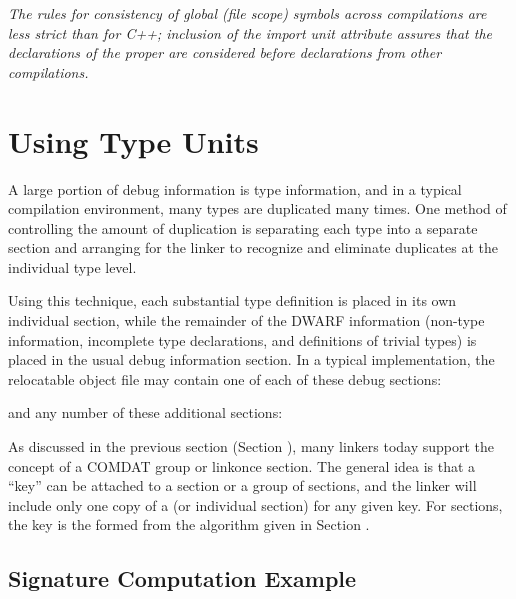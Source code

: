 \textit{The  rules for consistency of global (file scope) symbols
across compilations are less strict than for C++; inclusion
of the import unit attribute assures that the declarations of
the proper  are considered before declarations
from other compilations.}


\section{Using Type Units}
\label{app:usingtypeunits}

A large portion of debug information is type information, and
in a typical compilation environment, many types are duplicated
many times. One method of controlling the amount of duplication
is separating each type into a separate 
 section
and arranging for the linker to recognize and eliminate
duplicates at the individual type level.

Using this technique, each substantial type definition is
placed in its own individual section, while the remainder
of the DWARF information (non-type information, incomplete
type declarations, and definitions of trivial types) is
placed in the usual debug information section. In a typical
implementation, the relocatable object file may contain one
of each of these debug sections:

\begin{alltt}
\end{alltt}

and any number of these additional sections:

\begin{alltt}
\end{alltt}

As discussed in the previous section 
(Section ), 
many
linkers today support the concept of a COMDAT group or
linkonce section. The general idea is that a ``key'' can be
attached to a section or a group of sections, and the linker
will include only one copy of a 
(or individual section) for any given key. 
For 
 sections, the
key is the 
formed from the algorithm given in
Section .

\subsection{Signature Computation Example}
\label{app:signaturecomputationexample}

